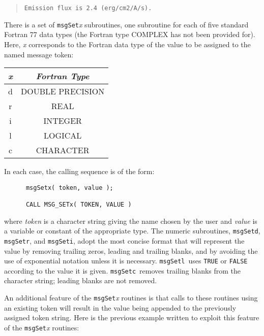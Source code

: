 \documentclass[twoside,11pt]{article}
\renewcommand{\_}{\texttt{\symbol{95}}}
\newcommand{\func}[1]{\texttt{#1}}
\newcommand{\farg}[1]{\textit{#1}}
\newcommand{\msgsetr}{\func{msgSetr}}
\newcommand{\msgsetd}{\func{msgSetd}}
\newcommand{\msgseti}{\func{msgSeti}}
\newcommand{\msgsetl}{\func{msgSetl}}
\newcommand{\msgsetc}{\func{msgSetc}}
\begin{document}
\begin {quote}
\begin {small}
\begin{verbatim}
Emission flux is 2.4 (erg/cm2/A/s).
\end{verbatim}
\end {small}
\end {quote}

There is a set of \func{msgSet}\textit{x} subroutines, one subroutine for each of five
standard Fortran 77 data types (the Fortran type COMPLEX has not been provided
for).
Here, \textit{x} corresponds to the Fortran data type of the value to be assigned
to the named message token:

\begin {center}
\begin {tabular}{||c|c||}
\hline
\textit{x} & \textit{Fortran Type}\\
\hline
d & DOUBLE PRECISION\\
r & REAL\\
i & INTEGER\\
l & LOGICAL\\
c & CHARACTER\\
\hline
\end {tabular}
\end {center}

In each case, the calling sequence is of the form:

\begin {small}
\begin{verbatim}
      msgSetx( token, value );

      CALL MSG_SETx( TOKEN, VALUE )
\end{verbatim}
\end {small}

where \farg{token} is a character string giving the name chosen by the user and \farg{value}
is a variable or constant of the appropriate type.
The numeric subroutines, \msgsetd, \msgsetr, and \msgseti, adopt the most
concise format that will represent the value by removing trailing zeros,
leading and trailing blanks, and by avoiding the use of exponential notation
unless it is necessary.
\msgsetl\ uses \texttt{TRUE} or \texttt{FALSE} according to the value it is
given. \msgsetc\ removes trailing blanks from the character string; leading
blanks are not removed.

An additional feature of the \func{msgSet}\textit{x} routines is that calls to these
routines using an existing token will result in the value being appended
to the previously assigned token string.
Here is the previous example written to exploit this feature of the
\func{msgSet}\textit{x} routines:
\end{document}
